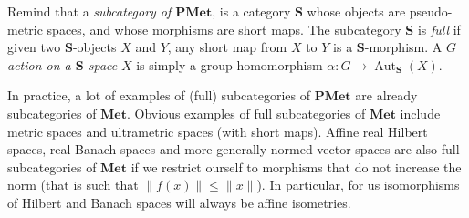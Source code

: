 \documentclass[a4paper]{article}
\theoremstyle{definition}
\newtheorem{defn}[lem]{Definition}
\DeclareMathOperator\Aut{Aut}
\newcommand*{\category}[1]{\textbf{#1}}
\newcommand*{\PMet}{\category{PMet}}
\newcommand*{\CatS}{\category{S}}
\begin{document}
Remind that a \emph{subcategory of $\PMet$}, is a category $\category S$ whose objects are pseudo-metric spaces, and whose morphisms are short maps.
The subcategory \CatS{} is \emph{full} if given two \CatS-objects $X$ and $Y$, any short map from $X$ to $Y$ is a \CatS-morphism.
A \emph{$G$ action on a $\category S$-space} $X$ is simply a group homomorphism $\alpha\colon G\to\Aut_{\CatS}(X)$.
%
%

In practice, a lot of examples of (full) subcategories of $\PMet$ are already subcategories of $\category{Met}$.
Obvious examples of full subcategories of $\category{Met}$ include metric spaces and ultrametric spaces (with short maps).
Affine real Hilbert spaces, real Banach spaces and more generally normed vector spaces are also full subcategories of $\category{Met}$ if we restrict ourself to morphisms that do not increase the norm (that is such that  $\|f(x)\|\leq\| x\|$).
In particular, for us isomorphisms of Hilbert and Banach spaces will always be affine isometries.
\end{document}
